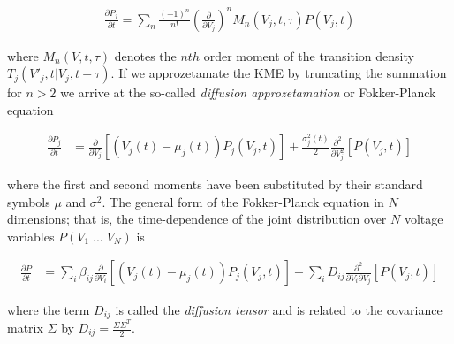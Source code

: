 \documentclass{ucetd}
\begin{document}
\begin{align}
\frac{\partial P_{j}}{\partial t} = \sum_{n} \frac{(-1)^{n}}{n!} \left(\frac{\partial}{\partial V_{j}}\right)^{n} M_{n}(V_{j},t,\tau) P(V_{j},t)
\end{align}

where $M_{n}(V,t,\tau)$ denotes the $nth$ order moment of the transition density $T_{j}(V'_{j}, t | V_{j}, t-\tau)$. If we approzetamate the KME by truncating the summation for $n > 2$ we arrive at the so-called \emph{diffusion approzetamation} or Fokker-Planck equation

\begin{align}
\frac{\partial P_{j}}{\partial t} &= \frac{\partial}{\partial V_{j}}[\left(V_{j}(t)-\mu_{j}(t)\right) P_{j}(V_{j},t)] + \frac{\sigma_{j}^{2}(t)}{2}\frac{\partial^{2}}{\partial V_{j}^{2}}[P(V_{j},t)]
\end{align}

where the first and second moments have been substituted by their standard symbols $\mu$ and $\sigma^{2}$. The general form of the Fokker-Planck equation in $N$ dimensions; that is, the time-dependence of the joint distribution over $N$ voltage variables $P(V_{1}\;...\;V_{N})$ is

\begin{align}
\frac{\partial P}{\partial t} &= \sum_{i}
\beta_{ij}\frac{\partial}{\partial V_{i}}[\left(V_{j}(t)-\mu_{j}(t)\right) P_{j}(V_{j},t)] + \sum_{i}D_{ij}\frac{\partial^{2}}{\partial V_{i}\partial V_{j}}[P(V_{j},t)]
\end{align}

where the term $D_{ij}$ is called the \emph{diffusion tensor} and is related to the covariance matrix $\Sigma$ by $D_{ij} = \frac{\Sigma\Sigma^{T}}{2}$.
\end{document}
